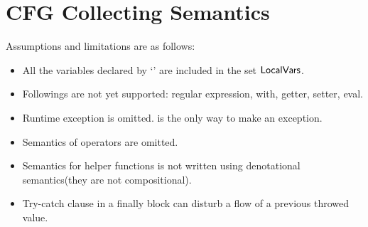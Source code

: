 

\chapter{CFG Collecting Semantics}
 Assumptions and limitations are as follows:
\begin{itemize}
\item All the variables declared by `' are included in the set $\mbox{\textsf{LocalVars}}$.
\item Followings are not yet supported: regular expression, with, getter, setter, eval.
\item Runtime exception is omitted.  is the only way to make an exception.
\item Semantics of operators are omitted.
\item Semantics for helper functions is not written using denotational semantics(they are not compositional).
\item Try-catch clause in a finally block can disturb a flow of a previous throwed value.
\end{itemize}

